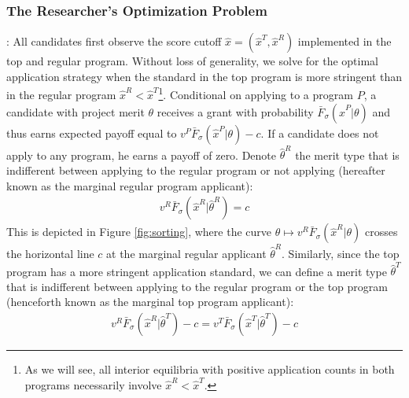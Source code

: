 \documentclass[12pt,reqno]{amsart}
\theoremstyle{definition}
\theoremstyle{plain} %
\begin{document}
\subsubsection{The Researcher's Optimization Problem}: All candidates first observe the score cutoff $\hat{x} = (\hat{x}^T,\hat{x}^R)$ implemented in the top and regular program. Without loss of generality, we solve for the optimal application strategy when the standard in the top program is more stringent than in the regular program $\hat{x}^R < \hat{x}^T$\footnote{As we will see, all interior equilibria with positive application counts in both programs necessarily involve $\hat{x}^R < \hat{x}^T$.}. Conditional on applying to a program $P$, a candidate with project merit $\theta$ receives a grant with probability $\bar{F}_{\sigma}(\hat{x}^P|\theta)$ and thus earns expected payoff equal to $v^P\bar{F}_{\sigma}(\hat{x}^P|\theta) - c$. If a candidate does not apply to any program, he earns a payoff of zero. Denote $\hat{\theta}^R$ the merit type that is indifferent between applying to the regular program or not applying (hereafter known as the marginal regular program applicant):
\begin{align}\label{eq:regular_indifference}
    v^R\bar{F}_{\sigma}(\hat{x}^R|\hat{\theta}^R) = c
\end{align}
This is depicted in Figure \ref{fig:sorting}, where the curve $\theta\mapsto v^R\bar{F}_{\sigma}(\hat{x}^R|\theta)$ crosses the horizontal line $c$ at the marginal regular applicant $\hat{\theta}^R$. Similarly, since the top program has a more stringent application standard, we can define a merit type $\hat{\theta}^T$ that is indifferent between applying to the regular program or the top program (henceforth known as the marginal top program applicant):
\begin{align}\label{eq:top_indifference}
    v^R\bar{F}_{\sigma}(\hat{x}^R|\hat{\theta}^T) - c= v^T\bar{F}_{\sigma}(\hat{x}^T|\hat{\theta}^T) - c
\end{align}
\end{document}
